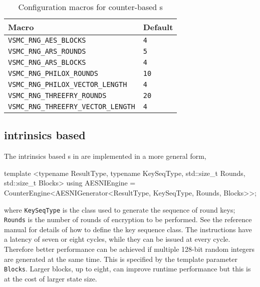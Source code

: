 \begin{table}
  \begin{tabularx}{\textwidth}{XX}
    \toprule
    Macro & Default \\
    \midrule
    \verb|VSMC_RNG_AES_BLOCKS|             & \verb|4|  \\
    \verb|VSMC_RNG_ARS_ROUNDS|             & \verb|5|  \\
    \verb|VSMC_RNG_ARS_BLOCKS|             & \verb|4|  \\
    \verb|VSMC_RNG_PHILOX_ROUNDS|          & \verb|10| \\
    \verb|VSMC_RNG_PHILOX_VECTOR_LENGTH|   & \verb|4|  \\
    \verb|VSMC_RNG_THREEFRY_ROUNDS|        & \verb|20| \\
    \verb|VSMC_RNG_THREEFRY_VECTOR_LENGTH| & \verb|4|  \\
    \bottomrule
  \end{tabularx}
  \caption{Configuration macros for counter-based \rng{}s}
  \label{tab:Configuration macros for counter-based RNGs}
\end{table}

\subsection{\protect\aesni intrinsics based \protect\rng}
\label{sub:AES-NI intrinsics based RNG}

The \aesni intrinsics based \rng{}s in \textcite{Salmon:2011um} are implemented
in a more general form,
\begin{cppcode}
  template <typename ResultType, typename KeySeqType, std::size_t Rounds,
      std::size_t Blocks>
  using AESNIEngine =
      CounterEngine<AESNIGenerator<ResultType, KeySeqType, Rounds, Blocks>>;
\end{cppcode}
where \verb|KeySeqType| is the class used to generate the sequence of round
keys; \verb|Rounds| is the number of rounds of \aes encryption to be performed.
See the reference manual for details of how to define the key sequence class.
The \aesni instructions have a latency of seven or eight cycles, while they can
be issued at every cycle. Therefore better performance can be achieved if
multiple 128-bit random integers are generated at the same time. This is
specified by the template parameter \verb|Blocks|. Larger blocks, up to eight,
can improve runtime performance but this is at the cost of larger state size.

